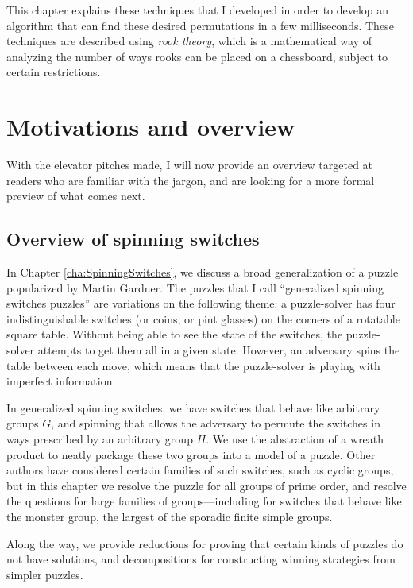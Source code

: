 This chapter explains these techniques that I developed in order to develop
an algorithm that can find these desired permutations in a few milliseconds.
These techniques are
described using \textit{rook theory}, which is a mathematical way of analyzing
the number of ways rooks can be placed on a chessboard, subject to certain
restrictions.

\section{Motivations and overview}
With the elevator pitches made, I will now provide an overview targeted at
readers who are familiar with the jargon, and are looking for a more formal
preview of what comes next.

\subsection{Overview of spinning switches}
In Chapter \ref{cha:SpinningSwitches}, we discuss a broad generalization of a
puzzle popularized by Martin Gardner. The puzzles that I call
``generalized spinning switches puzzles'' are variations on the following theme:
a puzzle-solver has four indistinguishable switches (or coins, or pint glasses)
on the corners of a rotatable square table. Without being able to see the state
of the switches, the puzzle-solver attempts to get them all in a given state.
However, an adversary spins the table between each move, which means that the
puzzle-solver is playing with imperfect information.

In generalized spinning switches, we have switches that behave like arbitrary
groups $G$, and spinning that allows the adversary to permute the switches in
ways prescribed by an arbitrary group $H$. We use the abstraction of a wreath
product to neatly package these two groups into a model of a puzzle.
Other authors have considered certain families of such switches, such as cyclic
groups, but in this chapter we resolve the puzzle for all groups of prime order,
and resolve the questions for large families of groups---including for switches
that behave like the monster group, the largest of the sporadic finite simple
groups.

Along the way, we provide reductions for proving that certain kinds of puzzles
do not have solutions, and decompositions for constructing winning strategies
from simpler puzzles.

